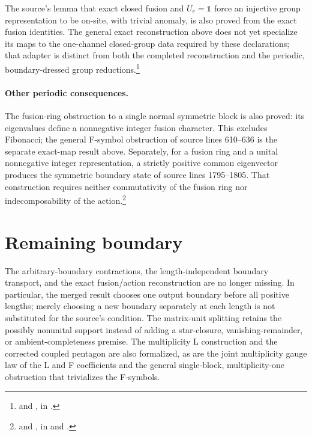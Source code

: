 \documentclass{article}
\begin{document}
The source's lemma that exact closed fusion and $U_e=\mathbb 1$ force an
injective group representation to be on-site, with trivial anomaly, is
also proved from the exact fusion identities. The general exact reconstruction above does not yet specialize its
maps to the one-channel closed-group data required by these declarations;
that adapter is distinct from both the completed reconstruction and the
periodic, boundary-dressed group reductions.\footnote{
     and
    , in
    .}

\paragraph{Other periodic consequences.}
The fusion-ring obstruction to a single normal symmetric block is also
proved: its eigenvalues define a nonnegative integer fusion character.
This excludes Fibonacci; the general F-symbol obstruction of source lines
610--636 is the separate exact-map result above. Separately, for a fusion ring and a unital
nonnegative integer representation, a strictly positive common eigenvector
produces the symmetric boundary state of source lines 1795--1805.
That construction requires neither commutativity of the fusion ring nor
indecomposability of the action.\footnote{
     and
    , in
     and
    .}

\section{Remaining boundary}

The arbitrary-boundary contractions, the length-independent boundary
transport, and the exact fusion/action reconstruction are no longer
missing. In particular, the merged result chooses one output boundary
before all positive lengths; merely choosing a new boundary separately
at each length is not substituted for the source's condition. The
matrix-unit splitting retains the possibly nonunital support instead of
adding a star-closure, vanishing-remainder, or ambient-completeness premise.
The multiplicity L construction and the corrected coupled pentagon are
also formalized, as are the joint multiplicity gauge law of the L and F
coefficients and the general single-block, multiplicity-one obstruction
that trivializes the F-symbols.
\end{document}
